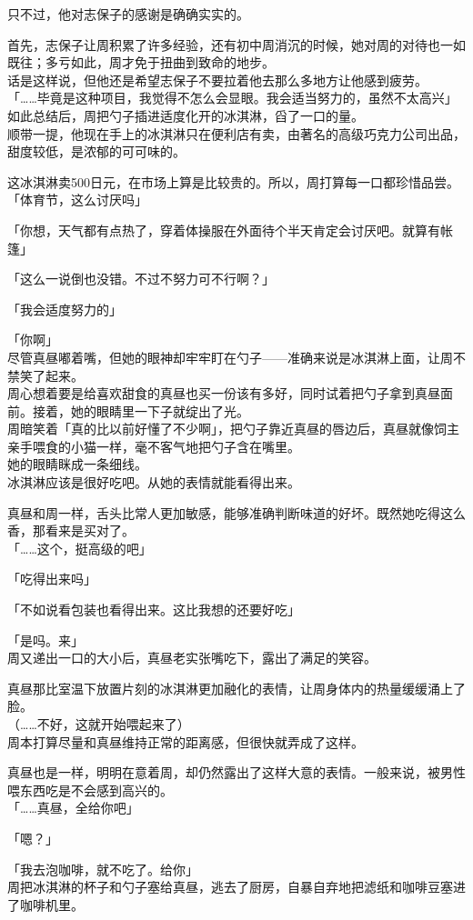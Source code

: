 只不过，他对志保子的感谢是确确实实的。

首先，志保子让周积累了许多经验，还有初中周消沉的时候，她对周的对待也一如既往；多亏如此，周才免于扭曲到致命的地步。\\

话是这样说，但他还是希望志保子不要拉着他去那么多地方让他感到疲劳。\\

「……毕竟是这种项目，我觉得不怎么会显眼。我会适当努力的，虽然不太高兴」\\

如此总结后，周把勺子插进适度化开的冰淇淋，舀了一口的量。\\

顺带一提，他现在手上的冰淇淋只在便利店有卖，由著名的高级巧克力公司出品，甜度较低，是浓郁的可可味的。

这冰淇淋卖500日元，在市场上算是比较贵的。所以，周打算每一口都珍惜品尝。\\

「体育节，这么讨厌吗」

「你想，天气都有点热了，穿着体操服在外面待个半天肯定会讨厌吧。就算有帐篷」

「这么一说倒也没错。不过不努力可不行啊？」

「我会适度努力的」

「你啊」\\

尽管真昼嘟着嘴，但她的眼神却牢牢盯在勺子——准确来说是冰淇淋上面，让周不禁笑了起来。\\

周心想着要是给喜欢甜食的真昼也买一份该有多好，同时试着把勺子拿到真昼面前。接着，她的眼睛里一下子就绽出了光。\\

周暗笑着「真的比以前好懂了不少啊」，把勺子靠近真昼的唇边后，真昼就像饲主亲手喂食的小猫一样，毫不客气地把勺子含在嘴里。\\

她的眼睛眯成一条细线。\\

冰淇淋应该是很好吃吧。从她的表情就能看得出来。

真昼和周一样，舌头比常人更加敏感，能够准确判断味道的好坏。既然她吃得这么香，那看来是买对了。\\

「……这个，挺高级的吧」

「吃得出来吗」

「不如说看包装也看得出来。这比我想的还要好吃」

「是吗。来」\\

周又递出一口的大小后，真昼老实张嘴吃下，露出了满足的笑容。

真昼那比室温下放置片刻的冰淇淋更加融化的表情，让周身体内的热量缓缓涌上了脸。\\

（……不好，这就开始喂起来了）\\

周本打算尽量和真昼维持正常的距离感，但很快就弄成了这样。

真昼也是一样，明明在意着周，却仍然露出了这样大意的表情。一般来说，被男性喂东西吃是不会感到高兴的。\\

「……真昼，全给你吧」

「嗯？」

「我去泡咖啡，就不吃了。给你」\\

周把冰淇淋的杯子和勺子塞给真昼，逃去了厨房，自暴自弃地把滤纸和咖啡豆塞进了咖啡机里。
